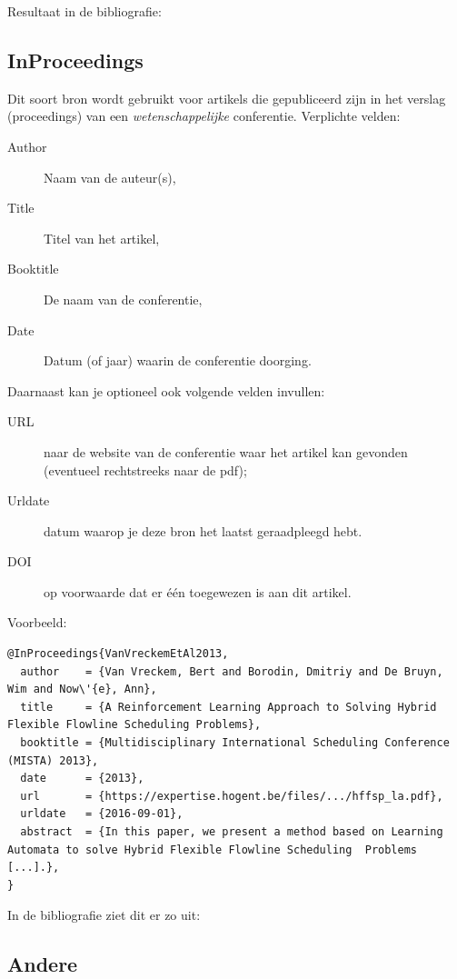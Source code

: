 Resultaat in de bibliografie:

\subsection{InProceedings}%
\label{ssec:inproceedings}

Dit soort bron wordt gebruikt voor artikels die gepubliceerd zijn in het verslag (proceedings) van een \emph{wetenschappelijke} conferentie. Verplichte velden:

\begin{description}
  \item[Author] Naam van de auteur(s),
  \item[Title] Titel van het artikel,
  \item[Booktitle] De naam van de conferentie,
  \item[Date] Datum (of jaar) waarin de conferentie doorging.
\end{description}

Daarnaast kan je optioneel ook volgende velden invullen:

\begin{description}
  \item[URL] naar de website van de conferentie waar het artikel kan gevonden (eventueel rechtstreeks naar de pdf);
  \item[Urldate] datum waarop je deze bron het laatst geraadpleegd hebt.
  \item[DOI] op voorwaarde dat er één toegewezen is aan dit artikel.
\end{description}

Voorbeeld:
\begin{verbatim}
@InProceedings{VanVreckemEtAl2013,
  author    = {Van Vreckem, Bert and Borodin, Dmitriy and De Bruyn, Wim and Now\'{e}, Ann},
  title     = {A Reinforcement Learning Approach to Solving Hybrid Flexible Flowline Scheduling Problems},
  booktitle = {Multidisciplinary International Scheduling Conference (MISTA) 2013},
  date      = {2013},
  url       = {https://expertise.hogent.be/files/.../hffsp_la.pdf},
  urldate   = {2016-09-01},
  abstract  = {In this paper, we present a method based on Learning Automata to solve Hybrid Flexible Flowline Scheduling  Problems [...].},
}
\end{verbatim}

In de bibliografie ziet dit er zo uit: 

\subsection{Andere}%
\label{ssec:andere}

